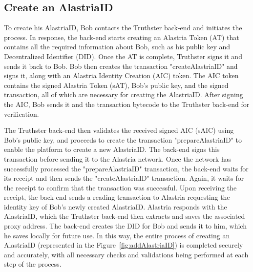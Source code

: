 \documentclass[target=mst,aauheader=]{thud}
\begin{document}
\subsection{Create an AlastriaID}

To create his AlastriaID, Bob contacts the Truthster back-end and initiates the process. In response, the back-end starts creating an Alastria Token (AT) that contains all the required information about Bob, such as his public key and Decentralized Identifier (DID). Once the AT is complete, Truthster signs it and sends it back to Bob. Bob then creates the transaction "createAlastriaID" and signs it, along with an Alastria Identity Creation (AIC) token. The AIC token contains the signed Alastria Token (sAT), Bob's public key, and the signed transaction, all of which are necessary for creating the AlastriaID. After signing the AIC, Bob sends it and the transaction bytecode to the Truthster back-end for verification.

The Truthster back-end then validates the received signed AIC (sAIC) using Bob's public key, and proceeds to create the transaction "prepareAlastriaID" to enable the platform to create a new AlastriaID. The back-end signs this transaction before sending it to the Alastria network. Once the network has successfully processed the "prepareAlastriaID" transaction, the back-end waits for its receipt and then sends the "createAlastriaID" transaction. Again, it waits for the receipt to confirm that the transaction was successful. Upon receiving the receipt, the back-end sends a reading transaction to Alastria requesting the identity key of Bob's newly created AlastriaID. Alastria responds with the AlastriaID, which the Truthster back-end then extracts and saves the associated proxy address. The back-end creates the DID for Bob and sends it to him, which he saves locally for future use. In this way, the entire process of creating an AlastriaID (represented in the Figure~\ref{fig:addAlastriaID}) is completed securely and accurately, with all necessary checks and validations being performed at each step of the process.
\end{document}

